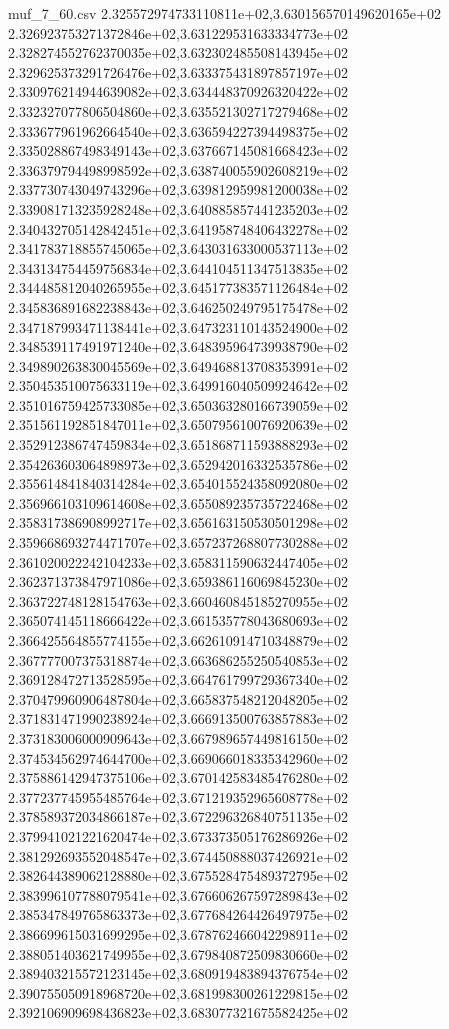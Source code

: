 \begin{filecontents*}{muf_7_60.csv}
2.325572974733110811e+02,3.630156570149620165e+02
2.326923753271372846e+02,3.631229531633334773e+02
2.328274552762370035e+02,3.632302485508143945e+02
2.329625373291726476e+02,3.633375431897857197e+02
2.330976214944639082e+02,3.634448370926320422e+02
2.332327077806504860e+02,3.635521302717279468e+02
2.333677961962664540e+02,3.636594227394498375e+02
2.335028867498349143e+02,3.637667145081668423e+02
2.336379794498998592e+02,3.638740055902608219e+02
2.337730743049743296e+02,3.639812959981200038e+02
2.339081713235928248e+02,3.640885857441235203e+02
2.340432705142842451e+02,3.641958748406432278e+02
2.341783718855745065e+02,3.643031633000537113e+02
2.343134754459756834e+02,3.644104511347513835e+02
2.344485812040265955e+02,3.645177383571126484e+02
2.345836891682238843e+02,3.646250249795175478e+02
2.347187993471138441e+02,3.647323110143524900e+02
2.348539117491971240e+02,3.648395964739938790e+02
2.349890263830045569e+02,3.649468813708353991e+02
2.350453510075633119e+02,3.649916040509924642e+02
2.351016759425733085e+02,3.650363280166739059e+02
2.351561192851847011e+02,3.650795610076920639e+02
2.352912386747459834e+02,3.651868711593888293e+02
2.354263603064898973e+02,3.652942016332535786e+02
2.355614841840314284e+02,3.654015524358092080e+02
2.356966103109614608e+02,3.655089235735722468e+02
2.358317386908992717e+02,3.656163150530501298e+02
2.359668693274471707e+02,3.657237268807730288e+02
2.361020022242104233e+02,3.658311590632447405e+02
2.362371373847971086e+02,3.659386116069845230e+02
2.363722748128154763e+02,3.660460845185270955e+02
2.365074145118666422e+02,3.661535778043680693e+02
2.366425564855774155e+02,3.662610914710348879e+02
2.367777007375318874e+02,3.663686255250540853e+02
2.369128472713528595e+02,3.664761799729367340e+02
2.370479960906487804e+02,3.665837548212048205e+02
2.371831471990238924e+02,3.666913500763857883e+02
2.373183006000909643e+02,3.667989657449816150e+02
2.374534562974644700e+02,3.669066018335342960e+02
2.375886142947375106e+02,3.670142583485476280e+02
2.377237745955485764e+02,3.671219352965608778e+02
2.378589372034866187e+02,3.672296326840751135e+02
2.379941021221620474e+02,3.673373505176286926e+02
2.381292693552048547e+02,3.674450888037426921e+02
2.382644389062128880e+02,3.675528475489372795e+02
2.383996107788079541e+02,3.676606267597289843e+02
2.385347849765863373e+02,3.677684264426497975e+02
2.386699615031699295e+02,3.678762466042298911e+02
2.388051403621749955e+02,3.679840872509830660e+02
2.389403215572123145e+02,3.680919483894376754e+02
2.390755050918968720e+02,3.681998300261229815e+02
2.392106909698436823e+02,3.683077321675582425e+02

\end{filecontents*}

